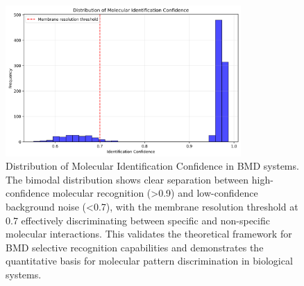 \begin{figure}[htbp]
\centering
\includegraphics[width=0.8\textwidth]{images/molecular_recognition.png}
\caption{Distribution of Molecular Identification Confidence in BMD systems. The bimodal distribution shows clear separation between high-confidence molecular recognition (>0.9) and low-confidence background noise (<0.7), with the membrane resolution threshold at 0.7 effectively discriminating between specific and non-specific molecular interactions. This validates the theoretical framework for BMD selective recognition capabilities and demonstrates the quantitative basis for molecular pattern discrimination in biological systems.}
\label{fig:molecular_recognition}
\end{figure}

